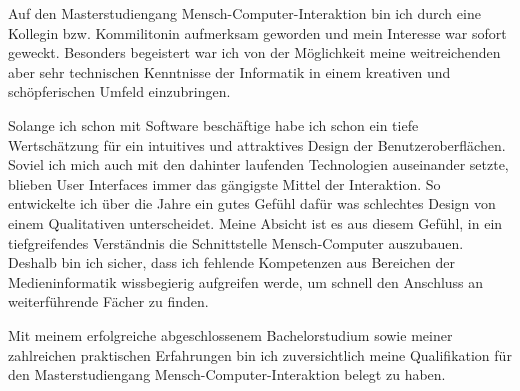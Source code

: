 \documentclass[11pt, a4paper]{awesome-cv}
\begin{document}
\begin{cvletter}

  Auf den Masterstudiengang Mensch-Computer-Interaktion bin ich durch eine Kollegin bzw. Kommilitonin aufmerksam geworden und mein Interesse war sofort geweckt. Besonders begeistert war ich von der Möglichkeit meine weitreichenden aber sehr technischen Kenntnisse der Informatik in einem kreativen und schöpferischen Umfeld einzubringen.

  Solange ich schon mit Software beschäftige habe ich schon ein tiefe Wertschätzung für ein intuitives und attraktives Design der Benutzeroberflächen. Soviel ich mich auch mit den dahinter laufenden Technologien auseinander setzte, blieben User Interfaces immer das gängigste Mittel der Interaktion. So entwickelte ich über die Jahre ein gutes Gefühl dafür was schlechtes Design von einem Qualitativen unterscheidet. Meine Absicht ist es aus diesem Gefühl, in ein tiefgreifendes Verständnis die Schnittstelle Mensch-Computer auszubauen. Deshalb bin ich sicher, dass ich fehlende Kompetenzen aus Bereichen der Medieninformatik wissbegierig aufgreifen werde, um schnell den Anschluss an weiterführende Fächer zu finden.

  Mit meinem erfolgreiche abgeschlossenem Bachelorstudium sowie meiner zahlreichen praktischen Erfahrungen bin ich zuversichtlich meine Qualifikation für den Masterstudiengang Mensch-Computer-Interaktion belegt zu haben.

  \makeletterclosing

\end{cvletter}



\newpage
\end{document}
